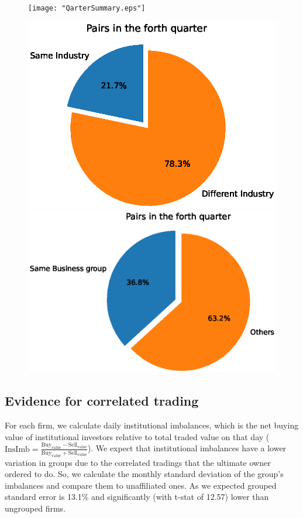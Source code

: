 \documentclass[12pt, a4paper]{article}
\begin{document}
 \begin{figure}[htbp]
	\centering  
	\texttt{[image: "QarterSummary.eps"]}
\end{figure}

	\begin{figure}   
	\centering
	\includegraphics[width=0.45\linewidth]{"sameIndustryinQuarter.eps"}
	\includegraphics[width=0.45\linewidth]{"sameIBGinQuarter.eps"}
\end{figure}
\FloatBarrier


\begin{table}[htbp]
	\centering
	\caption{\scriptsize}
	\label{Qmresult2subsanple}
	\resizebox{0.85\textwidth}{!}{
		
	}
\end{table}




\FloatBarrier


\subsection{Evidence for correlated trading }

 
For each firm, we calculate daily institutional imbalances, which is the net buying value of institutional investors relative to total traded value on that day ($ \text{InsImb} = \frac{\text{Buy}_{\text{value}} - \text{Sell}_{\text{value}}}{\text{Buy}_{\text{value}} + \text{Sell}_{\text{value}}} $). 
We expect that institutional imbalances have a lower variation in groups due to the correlated tradings that the ultimate owner ordered to do. So, we calculate the monthly standard deviation of the group's imbalances and compare them to unaffiliated ones. As we expected grouped standard error is  13.1\% and significantly (with t-stat of 12.57) lower than ungrouped firms. 
\end{document}
